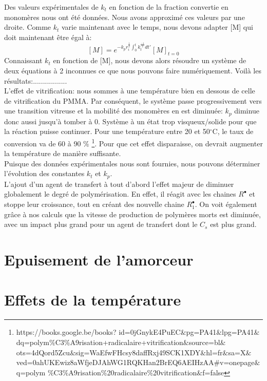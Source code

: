 \documentclass[a4paper,oneside,12pt]{article}
\begin{document}
Des valeurs expérimentales de $k_t$ en fonction de la fraction convertie en monomères nous ont été données. Nous avons approximé ces valeurs par une droite. Comme $k_t$ varie maintenant avec le temps, nous devons adapter [M] qui doit maintenant être égal à:
$$[M]=e^{-k_pr_i^{\frac{1}{2}}\int_0^t k_t^{\frac{-1}{2}}dt'}[M]_{t=0}$$
Connaissant $k_t$ en fonction de [M], nous devons alors résoudre un système de deux équations à 2 inconnues ce que nous pouvons faire numériquement. Voilà les résultats:.................\\

L'effet de vitrification: nous sommes à une température bien en dessous de celle de vitrification du PMMA. Par conséquent, le système passe progressivement vers une transition vitreuse et la mobilité des monomères en est diminuée: $k_p$ diminue donc aussi jusqu'à tomber à 0. Système à un état trop visqueux/solide pour que la réaction puisse continuer. Pour une température entre 20 et 50$^{\circ}$C, le taux de conversion va de 60 à 90 $\%$ \footnote{https://books.google.be/books?
id=0jGnykE4PuEC$\&$pg=PA41$\&$lpg=PA41$\&$dq=polym$\%$C3$\%$A9risation+radicalaire+vitrification$\&$source=bl$\&$ots=4dQord5Zcu$\&$sig=WaEfwFHcsy8daffRxj49SCK1XDY$\&$hl=fr$\&$sa=X$\&$ved=0ahUKEwiz8aWfjeDJAhWG1RQKHan2BrEQ6AEIHzAA$\#$v=onepage$\&$q=polym
$\%$C3$\%$A9risation$\%$20radicalaire$\%$20vitrification$\&$f=false}.
Pour que cet effet disparaisse, on devrait augmenter la température de manière suffisante.\\
Puisque des données expérimentales nous sont fournies, nous pouvons déterminer l'évolution des constantes $k_t$ et $k_p$.\\

L'ajout d'un agent de transfert à tout d'abord l'effet majeur de diminuer globalement le degré de polymérisation. En effet, il réagit avec les chaines $R^{\bullet}$ et stoppe leur croissance, tout en créant des nouvelle chaine $R_1^{\bullet}$. On voit également grâce à nos calculs que la vitesse de production de polymères morts est diminuée, avec un impact plus grand pour un agent de transfert dont le $C_s$ est plus grand.


\part{Epuisement de l'amorceur}

\part{Effets de la température}
\end{document}

